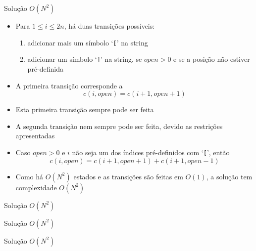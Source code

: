 \begin{frame}[fragile]{Solução $O(N^2)$}

    \begin{itemize}
        \item Para $1\leq i\leq 2n$, há duas transições possíveis:
        \begin{enumerate}
            \item adicionar mais um símbolo `\texttt{[}' na string
            \item adicionar um símbolo `\texttt{]}' na string, se $open > 0$ e se a posição não
                estiver pré-definida
        \end{enumerate}

        \item A primeira transição corresponde a
        \[
            c(i, open) = c(i + 1, open + 1)
        \]

        \item Esta primeira transição sempre pode ser feita

        \item A segunda transição nem sempre pode ser feita, devido as restrições apresentadas

        \item Caso $open > 0$ e $i$ não seja um dos índices pré-definidos com `\texttt{[}', então
        \[
            c(i, open) = c(i + 1, open + 1) + c(i + 1, open - 1)
        \]

        \item Como há $O(N^2)$ estados e as transições são feitas em $O(1)$, a solução tem
            complexidade $O(N^2)$
    \end{itemize}

\end{frame}

\begin{frame}[fragile]{Solução $O(N^2)$}
\end{frame}

\begin{frame}[fragile]{Solução $O(N^2)$}
\end{frame}

\begin{frame}[fragile]{Solução $O(N^2)$}
\end{frame}
